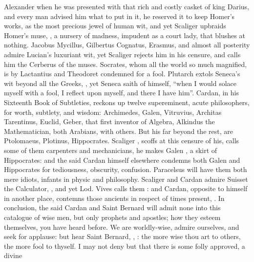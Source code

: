 Alexander when he was presented with that rich and costly casket of king
Darius, and every man advised him what to put in it, he reserved it to keep
Homer's works, as the most precious jewel of human wit, and yet
Scaliger upbraids Homer's muse, , a nursery of madness, impudent as a court
lady, that blushes at nothing. Jacobus Mycillus, Gilbertus Cognatus, Erasmus,
and almost all posterity admire Lucian's luxuriant wit, yet Scaliger rejects
him in his censure, and calls him the Cerberus of the muses. Socrates, whom all
the world so much magnified, is by Lactantius and Theodoret condemned for a
fool. Plutarch extols Seneca's wit beyond all the Greeks, ,
yet Seneca saith of himself, \enquote{when I would solace myself
with a fool, I reflect upon myself, and there I have him}. Cardan, in his
Sixteenth Book of Subtleties, reckons up twelve supereminent, acute
philosophers, for worth, subtlety, and wisdom: Archimedes, Galen, Vitruvius,
Architas Tarentinus, Euclid, Geber, that first inventor of Algebra, Alkindus
the Mathematician, both Arabians, with others. But his 
far beyond the rest, are Ptolomaeus, Plotinus, Hippocrates. Scaliger
, scoffs at this censure of his, calls
some of them carpenters and mechanicians, he makes Galen , a skirt of Hippocrates: and the said Cardan
himself elsewhere condemns both Galen and Hippocrates for tediousness,
obscurity, confusion. Paracelsus will have them both mere idiots, infants in
physic and philosophy. Scaliger and Cardan admire Suisset the Calculator,
, and yet Lod.
Vives calls them : and Cardan, opposite to himself in
another place, contemns those ancients in respect of times present,
. In conclusion, the said Cardan and Saint
Bernard will admit none into this catalogue of wise men,
but only prophets and apostles; how they esteem themselves,
you have heard before. We are worldly-wise, admire ourselves, and seek for
applause: but hear Saint Bernard, , \etc{} : the more wise thou art to others, the more
fool to thyself. I may not deny but that there is some folly approved, a divine
